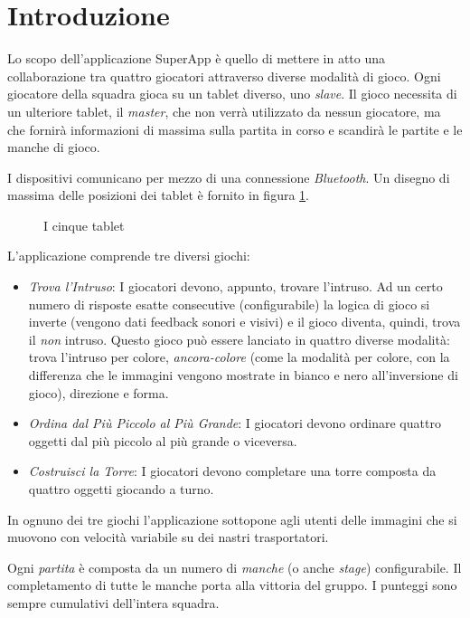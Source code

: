 \renewcommand*{\mypath}{superapp}%
\graphicspath{ {\mypath/images/} }


\section{Introduzione}
Lo scopo dell'applicazione SuperApp è quello di mettere in atto una collaborazione tra quattro giocatori attraverso diverse modalità di gioco.
Ogni giocatore della squadra gioca su un tablet diverso, uno \textit{slave}. Il gioco necessita di un ulteriore tablet, il \textit{master}, che non verrà utilizzato da nessun giocatore, ma che fornirà informazioni di massima sulla partita in corso e scandirà le partite e le manche di gioco.

I dispositivi comunicano per mezzo di una connessione \textit{Bluetooth}. Un disegno di massima delle posizioni dei tablet è fornito in figura \ref{fig:tablet5}.

\begin{figure}[h!]
\caption{I cinque tablet}
\label{fig:tablet5}
\end{figure}

L'applicazione comprende tre diversi giochi:

\begin{itemize}
\item \textit{Trova l'Intruso}: I giocatori devono, appunto, trovare l'intruso. Ad un certo numero di risposte esatte consecutive (configurabile) la logica di gioco si inverte (vengono dati feedback sonori e visivi) e il gioco diventa, quindi, trova il \textit{non} intruso. Questo gioco può essere lanciato in quattro diverse modalità: trova l'intruso per colore, \textit{ancora-colore} (come la modalità per colore, con la differenza che le immagini vengono mostrate in bianco e nero all'inversione di gioco), direzione e forma. 
\item \textit{Ordina dal Più Piccolo al Più Grande}: I giocatori devono ordinare quattro oggetti dal più piccolo al più grande o viceversa.
\item \textit{Costruisci la Torre}: I giocatori devono completare una torre composta da quattro oggetti giocando a turno.
\end{itemize}

In ognuno dei tre giochi l'applicazione sottopone agli utenti delle immagini che si muovono con velocità variabile su dei nastri trasportatori.

Ogni \textit{partita} è composta da un numero di \textit{manche} (o anche \textit{stage}) configurabile. Il completamento di tutte le manche porta alla vittoria del gruppo. I punteggi sono sempre cumulativi dell'intera squadra.

